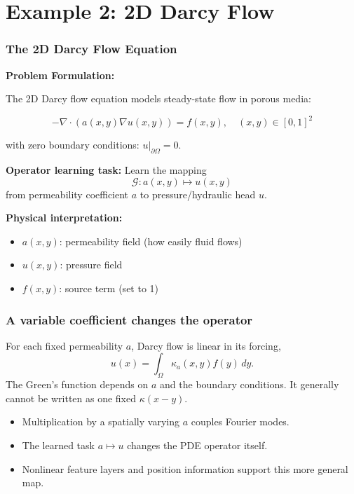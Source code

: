 \documentclass{beamer}
\begin{document}
\section{Example 2: 2D Darcy Flow}

\begin{frame}
\frametitle{The 2D Darcy Flow Equation}

\textbf{Problem Formulation:}

The 2D Darcy flow equation models steady-state flow in porous media:

\begin{equation*}
-\nabla \cdot (a(x, y) \nabla u(x, y)) = f(x, y), \quad (x, y) \in [0, 1]^2
\end{equation*}

with zero boundary conditions: $u|_{\partial\Omega} = 0$.

\vspace{0.3cm}

\textbf{Operator learning task:} Learn the mapping
\begin{equation*}
\mathcal{G}: a(x, y) \mapsto u(x, y)
\end{equation*}
from permeability coefficient $a$ to pressure/hydraulic head $u$.

\vspace{0.2cm}

\textbf{Physical interpretation:}
\begin{itemize}
    \item $a(x, y)$: permeability field (how easily fluid flows)
    \item $u(x, y)$: pressure field
    \item $f(x, y)$: source term (set to 1)
\end{itemize}

\end{frame}

\begin{frame}
\frametitle{A variable coefficient changes the operator}
For each fixed permeability $a$, Darcy flow is linear in its forcing,
\[
u(x)=\int_\Omega \kappa_a(x,y)f(y)\,dy.
\]
The Green's function depends on $a$ and the boundary conditions.
It generally cannot be written as one fixed $\kappa(x-y)$.
\begin{itemize}
\item Multiplication by a spatially varying $a$ couples Fourier modes.
\item The learned task $a\mapsto u$ changes the PDE operator itself.
\item Nonlinear feature layers and position information support this more general map.
\end{itemize}
\end{frame}
\end{document}
